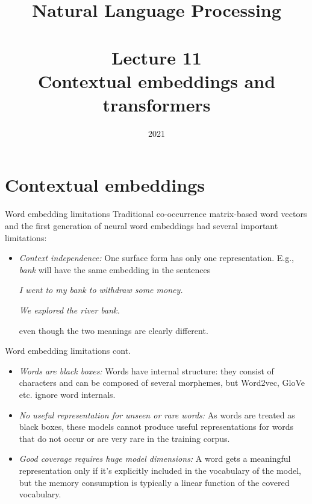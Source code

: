 \documentclass[style=upen, size=14pt]{powerdot}
\newcommand{\gold}{\color{arany}}
\theoremstyle{definition}
\begin{document}
\title{Natural Language Processing\\~~\\Lecture 11\\Contextual embeddings and\\
  transformers}

\date{2021}
\maketitle

\section{Contextual embeddings}

\begin{slide}[toc=Embedding limitations]{Word embedding limitations}
  Traditional co-occurrence matrix-based word vectors and the first generation
  of neural word embeddings had several important limitations:
  \begin{itemize}
  \item \emph{\gold Context independence:} One surface form has only one
    representation. E.g., \emph{bank} will have the same embedding in the
    sentences\medskip

    \emph{I went to my bank to withdraw some money.}\medskip


    \emph{We explored the river bank.}\medskip

    even though the two meanings are clearly different.
  \end{itemize}
\end{slide}

\begin{slide}[toc=]{Word embedding limitations cont.}
  \begin{itemize}
  \item \emph{\gold Words are black boxes:} Words have internal structure: they
    consist of characters and can be composed of several morphemes, but
    Word2vec, GloVe etc. ignore word internals.
  \item \emph{\gold No useful representation for unseen or rare words:} As words
    are treated as black boxes, these models cannot produce useful
    representations for words that do not occur or are very rare in the training
    corpus.
  \item \emph{\gold Good coverage requires huge model dimensions:} A word gets a
    meaningful representation only if it's explicitly included in the vocabulary
    of the model, but the memory consumption is typically a linear function of
    the covered vocabulary.
  \end{itemize}
\end{slide}
\end{document}
